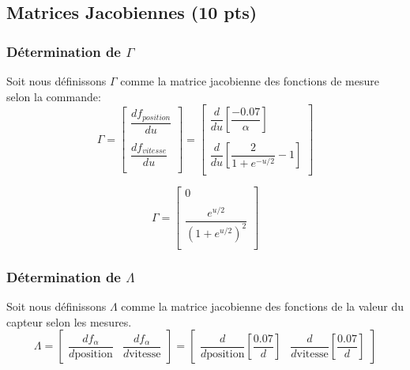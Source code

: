 \documentclass[12pt]{article}
\begin{document}
\subsection{Matrices Jacobiennes (10 pts)}

\subsubsection{Détermination de $\Gamma$}
Soit nous définissons $\Gamma$ comme la matrice jacobienne des fonctions de mesure selon la commande:
\begin{equation}
\Gamma =
\begin{bmatrix}
    \dfrac{df_{position}}{du}   \\
    \\
    \dfrac{df_{vitesse}}{du}   \\
\end{bmatrix}
=
\begin{bmatrix}
    \dfrac{d}{du} \left[\dfrac{-0.07}{\alpha}\right]   \\
    \\
    \dfrac{d}{du} \left[\dfrac{2}{1+e^{-u/2}}-1\right] \\
\end{bmatrix}
\end{equation}

\begin{equation}
\Gamma =
\begin{bmatrix}
    0   \\
    \\
    \dfrac{e^{u/2}}{(1+e^{u/2})^2} \\
\end{bmatrix}
\end{equation}

\subsubsection{Détermination de $\Lambda$}
Soit nous définissons $\Lambda$ comme la matrice jacobienne des fonctions de la valeur du capteur selon les mesures.
\begin{equation}
\Lambda =
\begin{bmatrix}
    \dfrac{df_{\alpha}}{d\text{position}}  & \dfrac{df_{\alpha}}{d\text{vitesse}}
\end{bmatrix}
=
\begin{bmatrix}
    \dfrac{d}{d\text{position}} \left[\dfrac{0.07}{d}\right] & \dfrac{d}{d\text{vitesse}}\left[\dfrac{0.07}{d}\right]
\end{bmatrix}
\end{equation}
\end{document}
